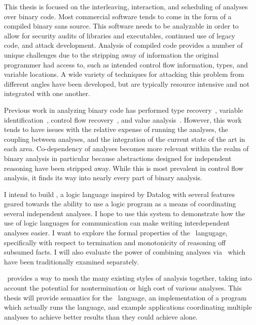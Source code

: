 This thesis is focused on the interleaving, interaction, and scheduling of analyses over binary code.
Most commercial software tends to come in the form of a compiled binary sans source.
This software needs to be analyzable in order to allow for security audits of libraries and executables, continued use of legacy code, and attack development.
Analysis of compiled code provides a number of unique challenges due to the stripping away of information the original programmer had access to, such as intended control flow information, types, and variable locations.
A wide variety of techniques for attacking this problem from different angles have been developed, but are typically resource intensive and not integrated with one another.

Previous work in analyzing binary code has performed type recovery~\cite{bitr}, variable identification~\cite{divine}, control flow recovery~\cite{jakstab,phoenix}, and value analysis~\cite{vsa}.
However, this work tends to have issues with the relative expense of running the analyses, the coupling between analyses, and the integration of the current state of the art in each area.
Co-dependency of analyses becomes more relevant within the realm of binary analysis in particular because abstractions designed for independent reasoning have been stripped away.
While this is most prevalent in control flow analysis, it finds its way into nearly every part of binary analysis.

I intend to build \sysname, a logic language inspired by Datalog with several features geared towards the ability to use a logic program as a means of coordinating several independent analyses.
I hope to use this system to demonstrate how the use of logic languages for communication can make writing interdependent analyses easier.
I want to explore the formal properties of the \sysname\ langugage, specifically with respect to termination and monotonicity of reasoning off subsumed facts.
I will also evaluate the power of combining analyses via \sysname\ which have been traditionally examined separately.

\sysname\ provides a way to mesh the many existing styles of analysis together, taking into account the potential for nontermination or high cost of various analyses. This thesis will provide semantics for the \sysname\ language, an implementation of a program which actually runs the language, and example applications coordinating multiple analyses to achieve better results than they could achieve alone.
